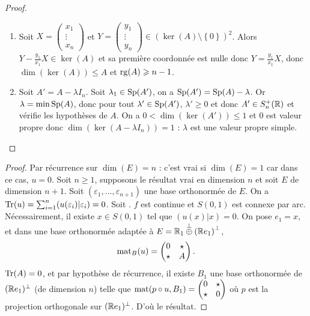 \documentclass[12pt]{article}
\begin{document}
\begin{proof}
\begin{enumerate}
		\item Soit $X=\begin{pmatrix}
			x_1\\\vdots\\x_n
		\end{pmatrix}$ et $Y=\begin{pmatrix}
			y_1\\\vdots\\y_n
		\end{pmatrix}\in\left(\ker(A)\setminus\left\lbrace0\right\rbrace\right)^{2}$. Alors $Y-\frac{y_1}{x_1}X\in\ker(A)$ et sa première coordonnée est nulle donc $Y=\frac{y_1}{x_1}X$, donc $\dim(\ker(A))\leqslant A$ et $\operatorname{rg}(A)\geqslant n-1$.

		\item Soit $A'=A-\lambda I_n$. Soit $\lambda_{1}\in\operatorname{Sp}(A')$, on a $\operatorname{Sp}(A')=\operatorname{Sp}(A)-\lambda$. Or $\lambda=\min\operatorname{Sp}(A)$, donc pour tout $\lambda'\in\operatorname{Sp}(A')$, $\lambda'\geqslant0$ et donc $A'\in S_n^{+}(\mathbb{R})$ et vérifie les hypothèses de $A$. On a $0<\dim(\ker(A'))\leqslant1$ et 0 est valeur propre donc $\dim(\ker(A-\lambda I_n))=1$ : $\lambda$ est une valeur propre simple.
	\end{enumerate}
\end{proof}

\begin{proof}
	Par récurrence sur $\dim(E)=n$ : c'est vrai si $\dim(E)=1$ car dans ce cas, $u=0$. Soit $n\geqslant1$, supposons le résultat vrai en dimension $n$ et soit $E$ de dimension $n+1$. Soit $(\varepsilon_{1},\dots,\varepsilon_{n+1})$ une base orthonormée de $E$. On a $\operatorname{Tr}(u)=\sum_{i=1}^{n}(u(\varepsilon_{i})|\varepsilon_{i})=0$. Soit . $f$ est continue et $S(0,1)$ est connexe par arc. Nécessairement, il existe $x\in S(0,1)$ tel que $(u(x)|x)=0$. On pose $e_1=x$, et dans une base orthonormée adaptée à $E=\mathbb{R}_{1}\overset{\perp}{\oplus}\left(\mathbb{R} e_{1}\right)^{\perp}$,
	\begin{equation}
		\operatorname{mat}_{B}(u)=\begin{pmatrix}
			0&\star\\\star &A
		\end{pmatrix}.
	\end{equation}
	$\operatorname{Tr}(A)=0$, et par hypothèse de récurrence, il existe $B_{1}$ une base orthonormée de $(\mathbb{R} e_1)^{\perp}$ (de dimension $n$) telle que $\operatorname{mat}(p\circ u, B_1)=\begin{pmatrix}
		0&\star\\
		\star&0
	\end{pmatrix}$ où $p$ est la projection orthogonale sur $(\mathbb{R} e_{1})^{\perp}$. D'où le résultat.
\end{proof}
\end{document}
